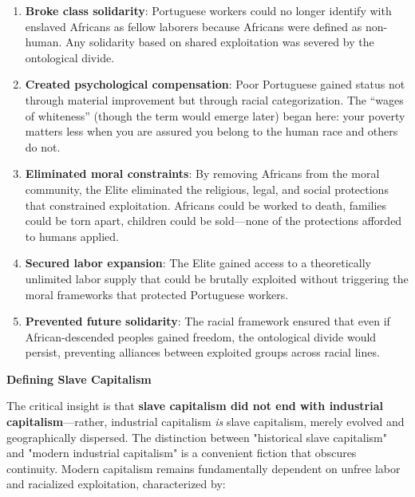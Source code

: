\documentclass[12pt]{article}
\begin{document}
\begin{enumerate}
    \item \textbf{Broke class solidarity}: Portuguese workers could no longer identify with enslaved Africans as fellow laborers because Africans were defined as non-human. Any solidarity based on shared exploitation was severed by the ontological divide.
    
    \item \textbf{Created psychological compensation}: Poor Portuguese gained status not through material improvement but through racial categorization. The ``wages of whiteness'' (though the term would emerge later) began here: your poverty matters less when you are assured you belong to the human race and others do not.
    
    \item \textbf{Eliminated moral constraints}: By removing Africans from the moral community, the Elite eliminated the religious, legal, and social protections that constrained exploitation. Africans could be worked to death, families could be torn apart, children could be sold---none of the protections afforded to humans applied.
    
    \item \textbf{Secured labor expansion}: The Elite gained access to a theoretically unlimited labor supply that could be brutally exploited without triggering the moral frameworks that protected Portuguese workers.
    
    \item \textbf{Prevented future solidarity}: The racial framework ensured that even if African-descended peoples gained freedom, the ontological divide would persist, preventing alliances between exploited groups across racial lines.
\end{enumerate}

\textbf{Defining Slave Capitalism}

The critical insight is that \textbf{slave capitalism did not end with industrial capitalism}---rather, industrial capitalism \textit{is} slave capitalism, merely evolved and geographically dispersed. The distinction between "historical slave capitalism" and "modern industrial capitalism" is a convenient fiction that obscures continuity. Modern capitalism remains fundamentally dependent on unfree labor and racialized exploitation, characterized by:
\end{document}
